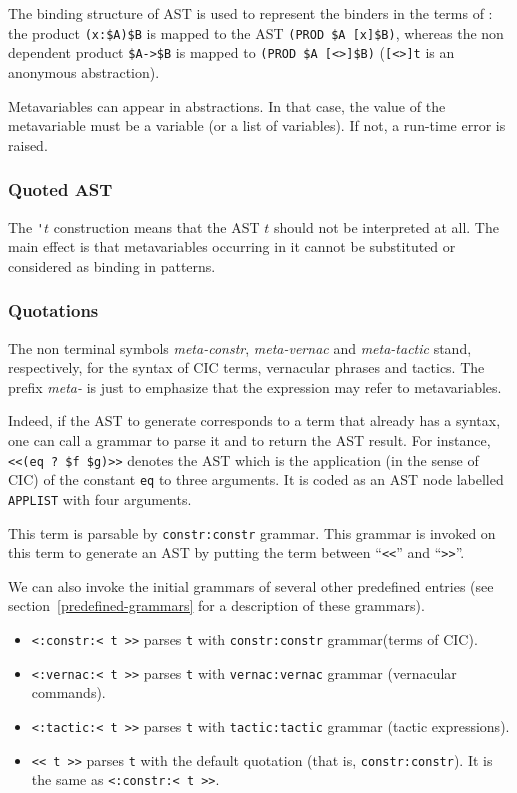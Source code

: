The binding structure of AST is used to represent the binders in the
terms of {\Coq}: the product \verb+(x:$A)$B+ is mapped to the AST
\verb+(PROD $A [x]$B)+, whereas the non dependent product
\verb+$A->$B+ is mapped to \verb+(PROD $A [<>]$B)+ (\verb+[<>]t+ is an
anonymous abstraction).

Metavariables can appear in abstractions. In that case, the value of
the metavariable must be a variable (or a list of variables). If not,
a run-time error is raised.

\subsubsection{Quoted AST}

The \verb+'+$t$ construction means that the AST $t$ should not be
interpreted at all. The main effect is that metavariables occurring in
it cannot be substituted or considered as binding in patterns.

\subsubsection{Quotations}

The non terminal symbols {\sl meta-constr}, {\sl meta-vernac} and
{\sl meta-tactic} stand, respectively, for the syntax of CIC terms,
vernacular phrases and tactics. The prefix {\sl meta-} is just to
emphasize that the expression may refer to metavariables.

Indeed, if the AST to generate corresponds to a term that already has
a syntax, one can call a grammar to parse it and to return the AST
result. For instance, \verb+<<(eq ? $f $g)>>+ denotes the AST which is
the application (in the sense of CIC) of the constant {\tt eq} to
three arguments. It is coded as an AST node labelled {\tt APPLIST}
with four arguments.

This term is parsable by \verb+constr:constr+ grammar. This grammar
is invoked on this term to generate an AST by putting the term between
``\verb+<<+'' and ``\verb+>>+''.

We can also invoke the initial grammars of several other predefined
entries (see section~\ref{predefined-grammars} for a description of
these grammars).

\begin{itemize}
\item \verb|<:constr:< t >>| parses {\tt t} with {\tt constr:constr}
  grammar(terms of CIC).
\item \verb|<:vernac:< t >>| parses {\tt t} with {\tt vernac:vernac}
  grammar (vernacular commands).
\item \verb|<:tactic:< t >>| parses {\tt t} with {\tt tactic:tactic}
  grammar (tactic expressions).
\item \verb|<< t >>| parses {\tt t} with the default quotation (that
  is, {\tt constr:constr}). It is the same as \verb|<:constr:< t >>|.
\end{itemize}

